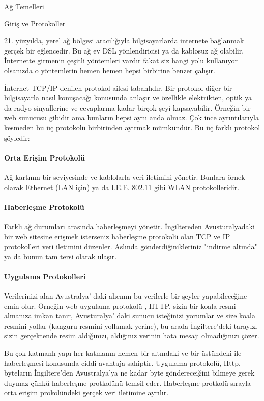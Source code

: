 \begin{section}{Ağ Temelleri}
\begin{subsection}{Giriş ve Protokoller}

21. yüzyılda, yerel ağ bölgesi aracılığıyla bilgisayarlarda internete bağlanmak gerçek bir eğlencedir. Bu ağ ev DSL yönlendiricisi ya da kablosuz ağ olabilir.
İnternette girmenin çeşitli yöntemleri vardır fakat siz hangi yolu kullanıyor olsanızda o yöntemlerin hemen hemen hepsi birbirine benzer çalışır.

    İnternet TCP/IP denilen protokol ailesi tabanlıdır. Bir protokol diğer bir bilgisayarla nasıl konuşacağı konusunda anlaşır ve özellikle elektrikten, optik ya da radyo sinyallerine ve cevaplarına kadar birçok şeyi kapsayabilir. Örneğin bir web sunucusu gibidir ama bunların hepsi aynı anda olmaz. Çok ince ayrıntılarıyla kesmeden bu üç protokolü birbirinden ayırmak mümkündür. Bu üç farklı protokol şöyledir:

\paragraph{Orta Erişim Protokolü}{Ağ kartının bir seviyesinde ve kablolarla veri iletimini yönetir. Bunlara örnek olarak Ethernet (LAN için) ya da I.E.E. 802.11 gibi WLAN protokolleridir.} 

\paragraph{Haberleşme Protokolü}{Farklı ağ durumları arasında haberleşmeyi yönetir. İngiltereden Avusturalyadaki bir web sitesine erişmek isterseniz haberleşme protokolü olan TCP ve IP protokolleri veri iletimini düzenler. Aslında gönderdiğinikleriniz "indirme altında" ya da bunun tam tersi olarak ulaşır.}

\paragraph{Uygulama Protokolleri}{Verilerinizi alan Avustralya' daki alıcının bu verilerle bir şeyler yapabileceğine emin olur. Örneğin web uygulama protokolü , HTTP, sizin bir koala resmi almanıza imkan tanır, Avusturalya' daki sunucu isteğinizi yorumlar ve size koala resmini yollar (kanguru resmini yollamak yerine), bu arada İngiltere'deki tarayızı sizin gerçektende resim aldığınızı, aldığınız verinin hata mesajı olmadığınızı çözer.}

Bu çok katmanlı yapı her katmanın hemen bir altındaki ve bir üstündeki ile haberleşmesi konusunda ciddi avantaja sahiptir. Uygulama protokolü, Http, byteların İngiltere'den Avustralya'ya ne kadar byte göndereceiğini bilmeye gerek duymaz çünkü haberleşme protkolünü temsil eder. Haberleşme protkolü sırayla orta erişim prokolündeki gerçek veri iletimine ayrılır.


\end{subsection}
\end{section}
